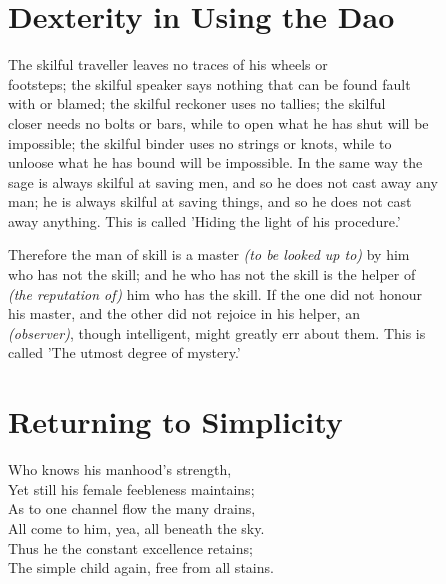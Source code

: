 \section*{Dexterity in Using the Dao}
    The skilful traveller leaves no traces of his wheels or\\
    footsteps; the skilful speaker says nothing that can be found fault\\
    with or blamed; the skilful reckoner uses no tallies; the skilful\\
    closer needs no bolts or bars, while to open what he has shut will be\\
    impossible; the skilful binder uses no strings or knots, while to\\
    unloose what he has bound will be impossible. In the same way the\\
    sage is always skilful at saving men, and so he does not cast away any\\
    man; he is always skilful at saving things, and so he does not cast\\
    away anything. This is called 'Hiding the light of his procedure.'\vspace{\baselineskip}
    
    Therefore the man of skill is a master \textit{(to be looked up to)} by him\\
    who has not the skill; and he who has not the skill is the helper of\\
    \textit{(the reputation of)} him who has the skill. If the one did not honour\\
    his master, and the other did not rejoice in his helper, an\\
    \textit{(observer)}, though intelligent, might greatly err about them. This is\\
    called 'The utmost degree of mystery.'\vspace{\baselineskip}
    
\section*{Returning to Simplicity}
    Who knows his manhood's strength,\\
    Yet still his female feebleness maintains;\\
    As to one channel flow the many drains,\\
    All come to him, yea, all beneath the sky.\\
    Thus he the constant excellence retains;\\
    The simple child again, free from all stains.\vspace{\baselineskip}
    
